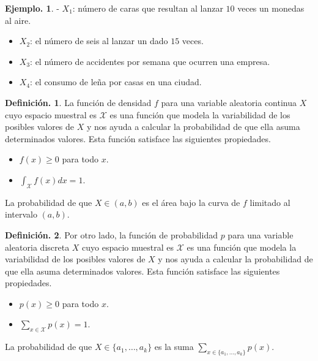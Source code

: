 \documentclass[]{book}
\providecommand{\tightlist}{%
  \setlength{\itemsep}{0pt}\setlength{\parskip}{0pt}}
\theoremstyle{definition}
\newtheorem{definition}{Definición.}[chapter]
\theoremstyle{definition}
\newtheorem{example}{Ejemplo.}[chapter]
\theoremstyle{definition}
\theoremstyle{remark}
\begin{document}
\begin{example}
\protect\hypertarget{exm:unnamed-chunk-130}{}{\label{exm:unnamed-chunk-130} }
- \(X_1\): número de caras que resultan al lanzar \(10\) veces un
monedas al aire.

\begin{itemize}
\item
  \(X_2\): el número de seis al lanzar un dado \(15\) veces.
\item
  \(X_3\): el número de accidentes por semana que ocurren una
  empresa.
\item
  \(X_4\): el consumo de leña por casas en una ciudad.
\end{itemize}
\end{example}

\begin{definition}
\protect\hypertarget{def:unnamed-chunk-131}{}{\label{def:unnamed-chunk-131} }
La función de densidad \(f\) para una variable aleatoria
continua \(X\) cuyo espacio muestral es \(\mathcal{X}\) es
una función que modela la variabilidad de los posibles
valores de \(X\) y nos ayuda a calcular la probabilidad de
que ella asuma determinados valores. Esta función
satisface las siguientes propiedades.

\begin{itemize}
\tightlist
\item
  \(f(x)\geq 0\) para todo \(x\).
\item
  \(\int_{\mathcal{X}}f(x)dx=1\).
\end{itemize}

La probabilidad de que \(X\in (a,b)\) es el área bajo la
curva de \(f\) limitado al intervalo \((a,b)\).
\end{definition}

\begin{definition}
\protect\hypertarget{def:unnamed-chunk-132}{}{\label{def:unnamed-chunk-132} }
Por otro lado, la función de probabilidad \(p\) para una
variable aleatoria discreta \(X\) cuyo espacio muestral es
\(\mathcal{X}\) es una función que modela la variabilidad
de los posibles valores de \(X\) y nos ayuda a calcular la
probabilidad de que ella asuma determinados valores.
Esta función satisface las siguientes propiedades.

\begin{itemize}
\tightlist
\item
  \(p(x)\geq 0\) para todo \(x\).
\item
  \(\sum_{x\in \mathcal{X}}p(x)=1\).
\end{itemize}

La probabilidad de que \(X\in \{a_1, \ldots, a_k \}\) es
la suma \(\sum_{x \in \{a_1, \ldots, a_k \}}p(x)\).
\end{definition}
\end{document}
